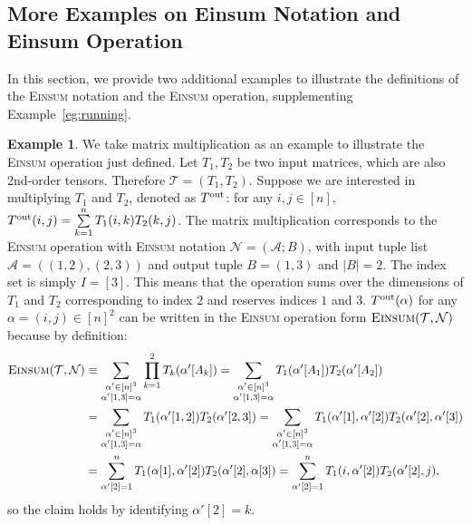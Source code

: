\documentclass[sn-mathphys, natbib=false]{sn-jnl}
\theoremstyle{plain}
\theoremstyle{definition}
\newtheorem{example}{Example}
\def\Einsum{\textsc{Einsum}}
\newcommand{\tensorcontraction}{\textsc{Einsum}}
\def\calA{\mathcal{A}}
\def\calT{\mathcal{T}}
\def\calN{\mathcal{N}}
\begin{document}
\begin{bibunit}[agsm]

\section{More Examples on Einsum Notation and Einsum Operation}
\label{app:examples}

In this section, we provide two additional examples to illustrate the definitions of the \Einsum{} notation and the \Einsum{} operation, supplementing Example~\ref{eg:running}.

\begin{example}
\label{eg:matrix multiplication}
We take matrix multiplication as an example to illustrate the \Einsum{} operation just defined. Let $T_1, T_2$ be two input matrices, which are also 2nd-order tensors. Therefore $\calT = (T_1, T_2)$. Suppose we are interested in multiplying $T_1$ and $T_2$, denoted as $T^{\rm out}$: for any $i, j \in [n]$, $T^{\rm out} (i, j) = \sum\limits_{k = 1}^n T_{1} (i, k) T_{2} (k, j)$. The matrix multiplication corresponds to the \Einsum{} operation with \Einsum{} notation $\calN = (\calA; B)$, with input tuple list $\calA = ((1,2),(2,3))$ and output tuple $B = (1,3)$ and $|B| = 2$. The index set is simply $I = [3]$. This means that the operation sums over the dimensions of $T_1$ and $T_2$ corresponding to index $2$ and reserves indices $1$ and $3$. $T^{\rm out} (\alpha)$ for any $\alpha = (i, j) \in  [n]^{2}$ can be written in the \Einsum{} operation form $\tensorcontraction(\calT, \calN)$ because by definition:
\begin{align*}
\tensorcontraction(\calT, \calN) & \equiv \sum_{\substack{\alpha'  \in [n]^3 \\ \alpha' [1, 3] = \alpha}} \prod_{k = 1}^{2} T_k (\alpha' [A_k]) = \sum_{\substack{\alpha' 
\in [n]^3 \\ \alpha' [1, 3] = \alpha}} T_1 (\alpha' [A_1]) T_2 (\alpha' [A_2]) \\
& = \sum_{\substack{\alpha'  \in [n]^3 \\ \alpha' [1, 3] = \alpha}} T_1 (\alpha' [1, 2]) T_2 (\alpha' [2, 3]) = \sum_{\substack{\alpha'  \in [n]^3 \\ \alpha' [1, 3] = \alpha}} T_1 (\alpha' [1], \alpha' [2]) T_2 (\alpha' [2], \alpha'[3]) \\
& = \sum_{\alpha' [2] = 1}^{n} T_{1} (\alpha [1], \alpha' [2]) T_{2} (\alpha' [2], \alpha [3]) = \sum_{\alpha' [2] = 1}^{n} T_{1} (i, \alpha' [2]) T_{2} (\alpha' [2], j),
\end{align*}
so the claim holds by identifying $\alpha' [2] = k$.
\end{example}


\end{bibunit}
\end{document}

